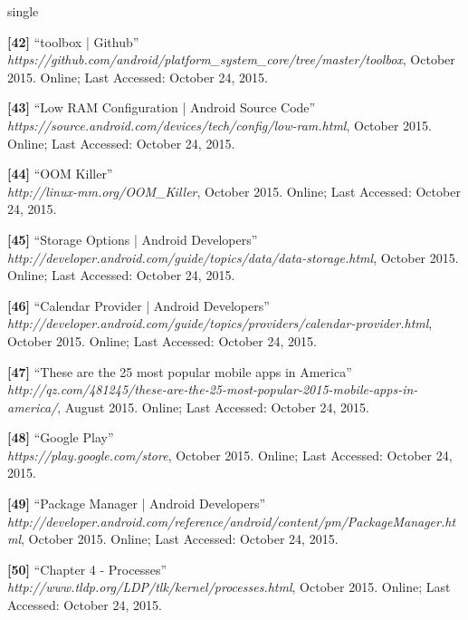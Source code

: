 \documentclass[12pt]{uthesis-v12}  %
\begin{document}
\begin{referencelist}{single}
	\item \textbf{[42]} ``toolbox | Github''
	\\\emph{https://github.com/android/platform\_system\_core/tree/master/toolbox}, October 2015. 
	Online; Last Accessed: October 24, 2015.	
					
	\item \textbf{[43]} ``Low RAM Configuration | Android Source Code''
	\\\emph{https://source.android.com/devices/tech/config/low-ram.html}, October 2015. 
	Online; Last Accessed: October 24, 2015.
						
	\item \textbf{[44]} ``OOM Killer''
	\\\emph{http://linux-mm.org/OOM\_Killer}, October 2015. 
	Online; Last Accessed: October 24, 2015.
	
	\item \textbf{[45]} ``Storage Options | Android Developers''
	\\\emph{http://developer.android.com/guide/topics/data/data-storage.html}, October 2015. 
	Online; Last Accessed: October 24, 2015.

	\item \textbf{[46]} ``Calendar Provider | Android Developers''
	\\\emph{http://developer.android.com/guide/topics/providers/calendar-provider.html}, October 2015. 
	Online; Last Accessed: October 24, 2015.

	\item \textbf{[47]} ``These are the 25 most popular mobile apps in America''
	\\\emph{http://qz.com/481245/these-are-the-25-most-popular-2015-mobile-apps-in-america/}, August 2015. 
	Online; Last Accessed: October 24, 2015.
	
	\item \textbf{[48]} ``Google Play''
	\\\emph{https://play.google.com/store}, October 2015. 
	Online; Last Accessed: October 24, 2015.
											
	\item \textbf{[49]} ``Package Manager | Android Developers''
	\\\emph{http://developer.android.com/reference/android/content/pm/PackageManager.html}, October 2015. 
	Online; Last Accessed: October 24, 2015.

	\item \textbf{[50]} ``Chapter 4 - Processes''
	\\\emph{http://www.tldp.org/LDP/tlk/kernel/processes.html}, October 2015. 
	Online; Last Accessed: October 24, 2015.
	

\end{referencelist}
\end{document}
